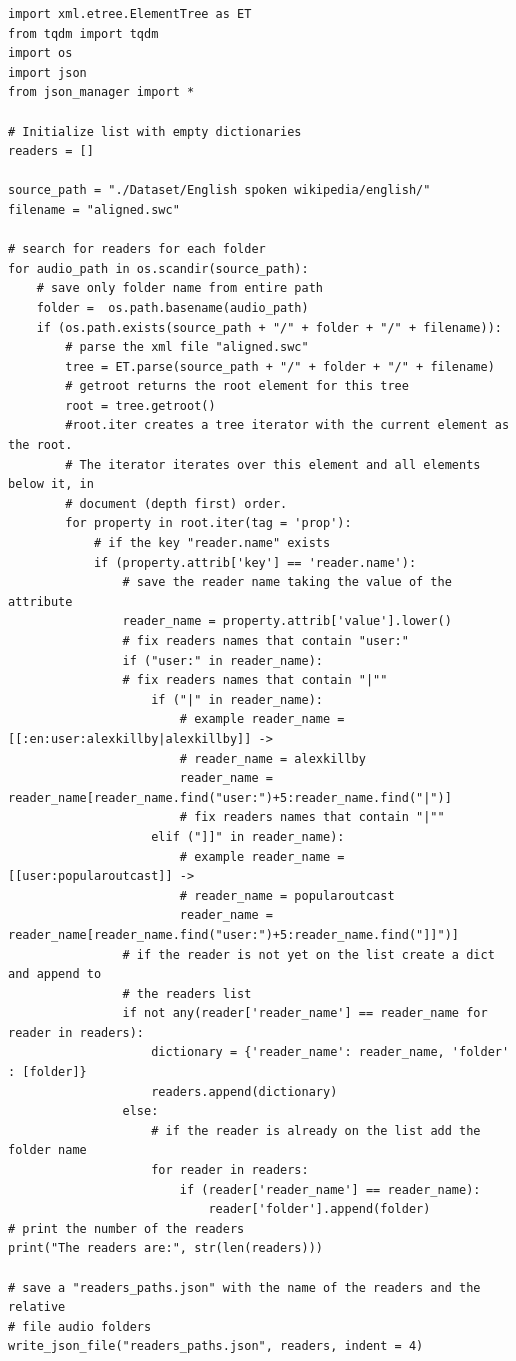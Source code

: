 \documentclass[12pt,a4paper,titlepage]{article}
\begin{document}
\begin{lstlisting}[language=iPython,firstnumber=1, caption=xml\_parser\_readers.py, label=xml_parser_readers,captionpos=b]
import xml.etree.ElementTree as ET
from tqdm import tqdm
import os
import json
from json_manager import *

# Initialize list with empty dictionaries
readers = []

source_path = "./Dataset/English spoken wikipedia/english/"
filename = "aligned.swc"

# search for readers for each folder
for audio_path in os.scandir(source_path):
	# save only folder name from entire path
	folder =  os.path.basename(audio_path)
	if (os.path.exists(source_path + "/" + folder + "/" + filename)):
		# parse the xml file "aligned.swc"
		tree = ET.parse(source_path + "/" + folder + "/" + filename)
		# getroot returns the root element for this tree
		root = tree.getroot()
		#root.iter creates a tree iterator with the current element as the root.
		# The iterator iterates over this element and all elements below it, in 
		# document (depth first) order.
		for property in root.iter(tag = 'prop'):
			# if the key "reader.name" exists
			if (property.attrib['key'] == 'reader.name'):
				# save the reader name taking the value of the attribute
				reader_name = property.attrib['value'].lower()
				# fix readers names that contain "user:"
				if ("user:" in reader_name):
				# fix readers names that contain "|""
					if ("|" in reader_name):
						# example reader_name = [[:en:user:alexkillby|alexkillby]] -> 
						# reader_name = alexkillby
						reader_name = reader_name[reader_name.find("user:")+5:reader_name.find("|")]
						# fix readers names that contain "|""
					elif ("]]" in reader_name):
						# example reader_name = [[user:popularoutcast]] -> 
						# reader_name = popularoutcast
						reader_name = reader_name[reader_name.find("user:")+5:reader_name.find("]]")]
				# if the reader is not yet on the list create a dict and append to
				# the readers list
				if not any(reader['reader_name'] == reader_name for reader in readers):
					dictionary = {'reader_name': reader_name, 'folder' : [folder]}
					readers.append(dictionary)
				else:
					# if the reader is already on the list add the folder name
					for reader in readers:
						if (reader['reader_name'] == reader_name):
							reader['folder'].append(folder)
# print the number of the readers
print("The readers are:", str(len(readers)))

# save a "readers_paths.json" with the name of the readers and the relative
# file audio folders
write_json_file("readers_paths.json", readers, indent = 4)
\end{lstlisting}
\end{document}
